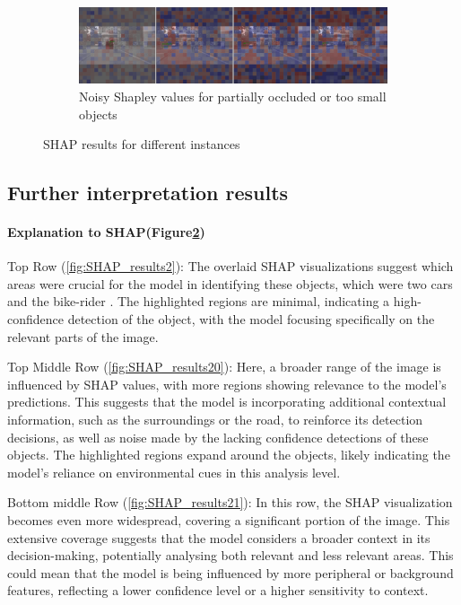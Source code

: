 \begin{figure}[h!]
    \hfill
    \begin{subfigure}[b]{\textwidth}
        \includegraphics[width=\textwidth]{figures/output2,2}
        \caption{Noisy Shapley values for partially occluded or too small objects }\label{fig:SHAP_results22}
    \end{subfigure}
    \caption{SHAP results for different instances}
    \label{fig:SHAP_results_combined}
\end{figure}
\subsection{Further interpretation results}
\paragraph{Explanation to SHAP(Figure\ref{fig:SHAP_results_combined})}


Top Row (\ref{fig:SHAP_results2}): The overlaid SHAP visualizations suggest which areas were crucial for the model in identifying these objects, which were two cars and the bike-rider .
The highlighted regions are minimal, indicating a high-confidence detection of the object, with the model focusing specifically on the relevant parts of the image.

Top Middle Row (\ref{fig:SHAP_results20}): Here, a broader range of the image is influenced by SHAP values, with more regions showing relevance to the model's predictions.
This suggests that the model is incorporating additional contextual information, such as the surroundings or the road, to reinforce its detection decisions, as well as noise made by the lacking confidence detections of these objects.
The highlighted regions expand around the objects, likely indicating the model's reliance on environmental cues in this analysis level.

Bottom middle Row (\ref{fig:SHAP_results21}): In this row, the SHAP visualization becomes even more widespread, covering a significant portion of the image. This extensive coverage suggests that the model considers a broader context in its decision-making, potentially analysing both relevant and less relevant areas. This could mean that the model is being influenced by more peripheral or background features, reflecting a lower confidence level or a higher sensitivity to context.

